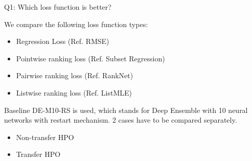 \documentclass{beamer}
\begin{document}
\begin{frame}[t]{Q1: Which loss function is better?}

We compare the following loss function types:
\begin{itemize}
\item Regression Loss (Ref.  RMSE)
\item Pointwise ranking loss (Ref.  Subset Regression)
\item Pairwise ranking loss (Ref.  RankNet)
\item Listwise ranking loss (Ref.  ListMLE)
\end{itemize}
Baseline DE-M10-RS is used, which stands for Deep Ensemble with 10 neural networks with restart mechanism.
2 cases have to be compared separately.
\begin{itemize}
\item Non-transfer HPO
\item Transfer HPO
\end{itemize}


\end{frame}
\end{document}

